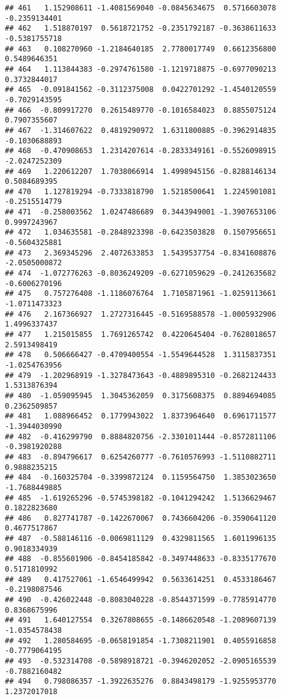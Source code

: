 \documentclass[
]{article}
\begin{document}
\begin{verbatim}
## 461   1.152908611 -1.4081569040 -0.0845634675  0.5716603078 -0.2359134401
## 462   1.518870197  0.5618721752 -0.2351792187 -0.3638611633 -0.5381755718
## 463   0.108270960 -1.2184640185  2.7780017749  0.6612356800  0.5489646351
## 464   1.113844383 -0.2974761580 -1.1219718875 -0.6977090213  0.3732844017
## 465  -0.091841562 -0.3112375008  0.0422701292 -1.4540120559 -0.7029143595
## 466  -0.809917270  0.2615489770 -0.1016584023  0.8855075124  0.7907355607
## 467  -1.314607622  0.4819290972  1.6311800885 -0.3962914835 -0.1030688893
## 468  -0.470908653  1.2314207614 -0.2833349161 -0.5526098915 -2.0247252309
## 469   1.220612207  1.7038066914  1.4998945156 -0.8288146134  0.5084689395
## 470   1.127819294 -0.7333818790  1.5218500641  1.2245901081 -0.2515514779
## 471  -0.258003562  1.0247486689  0.3443949001 -1.3907653106  0.9997243967
## 472   1.034635581 -0.2848923398 -0.6423503828  0.1507956651 -0.5604325881
## 473   2.369345296  2.4072633853  1.5439537754 -0.8341608876 -2.0505000872
## 474  -1.072776263 -0.8036249209 -0.6271059629 -0.2412635682 -0.6006270196
## 475   0.757276408 -1.1186076764  1.7105871961 -1.0259113661 -1.0711473323
## 476   2.167366927  1.2727316445 -0.5169588578 -1.0005932906  1.4996337437
## 477   1.215015855  1.7691265742  0.4220645404 -0.7628018657  2.5913498419
## 478   0.506666427 -0.4709400554 -1.5549644528  1.3115837351 -1.0254763956
## 479  -1.202968919 -1.3278473643 -0.4889895310 -0.2682124433  1.5313876394
## 480  -1.059095945  1.3045362059  0.3175608375  0.8894694085  0.2362509857
## 481   1.088966452  0.1779943022  1.8373964640  0.6961711577 -1.3944030990
## 482  -0.416299790  0.8884820756 -2.3301011444 -0.8572811106 -0.3981920288
## 483  -0.894796617  0.6254260777 -0.7610576993 -1.5110882711  0.9888235215
## 484  -0.160325704 -0.3399872124  0.1159564750  1.3853023650 -1.7688449885
## 485  -1.619265296 -0.5745398182 -0.1041294242  1.5136629467  0.1822823680
## 486   0.827741787 -0.1422670067  0.7436604206 -0.3590641120  0.4677517867
## 487  -0.588146116 -0.0069811129  0.4329811565  1.6011996135  0.9018334939
## 488  -0.855601906 -0.8454185842 -0.3497448633 -0.8335177670  0.5171810992
## 489   0.417527061 -1.6546499942  0.5633614251  0.4533186467 -0.2198087546
## 490  -0.426022448 -0.8083040228 -0.8544371599 -0.7785914770  0.8368675996
## 491   1.640127554  0.3267808655 -0.1486620548 -1.2089607139 -1.0354578438
## 492   1.280584695 -0.0658191854 -1.7308211901  0.4055916858 -0.7779064195
## 493  -0.532314708 -0.5898918721 -0.3946202052 -2.0905165539 -0.7882160482
## 494   0.798086357 -1.3922635276  0.8843498179 -1.9255953770  1.2372017018

\end{verbatim}
\end{document}
